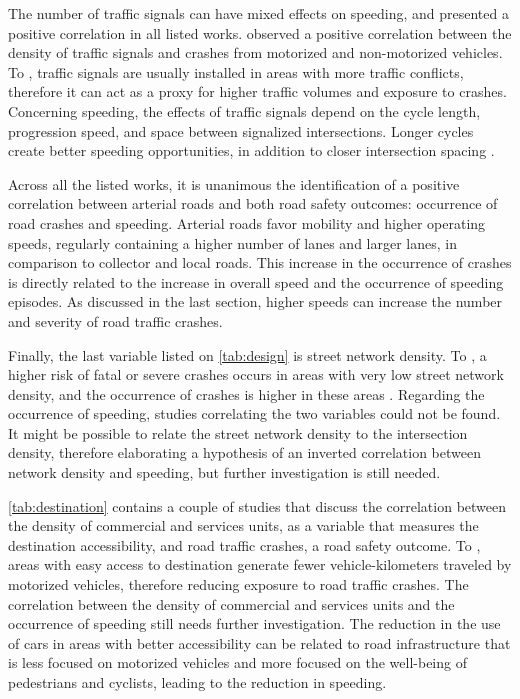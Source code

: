 The number of traffic signals can have mixed effects on speeding, and presented a positive correlation in all listed works. \textcite{Lovegrove2006,Lee2015} observed a positive correlation between the density of traffic signals and crashes from motorized and non-motorized vehicles. To \textcite{Obelheiro2020}, traffic signals are usually installed in areas with more traffic conflicts, therefore it can act as a proxy for higher traffic volumes and exposure to crashes. Concerning speeding, the effects of traffic signals depend on the cycle length, progression speed, and space between signalized intersections. Longer cycles create better speeding opportunities, in addition to closer intersection spacing \cite{Elvik2009,Furth2018}. 

Across all the listed works, it is unanimous the identification of a positive correlation between arterial roads and both road safety outcomes: occurrence of road crashes and speeding. Arterial roads favor mobility and higher operating speeds, regularly containing a higher number of lanes and larger lanes, in comparison to collector and local roads. This increase in the occurrence of crashes is directly related to the increase in overall speed and the occurrence of speeding episodes. As discussed in the last section, higher speeds can increase the number and severity of road traffic crashes. 

Finally, the last variable listed on \autoref{tab:design} is street network density. To \textcite{Marshall2010}, a higher risk of fatal or severe crashes occurs in areas with very low street network density, and the occurrence of crashes is higher in these areas \cite{Marshall2011}. Regarding the occurrence of speeding, studies correlating the two variables could not be found. It might be possible to relate the street network density to the intersection density, therefore elaborating a hypothesis of an inverted correlation between network density and speeding, but further investigation  is still needed. 

\autoref{tab:destination} contains a couple of studies that discuss the correlation between the density of commercial and services units, as a variable that measures the destination accessibility, and road traffic crashes, a road safety outcome. To \textcite{Ouyang2014,Welle2016}, areas with easy access to destination generate fewer vehicle-kilometers traveled by motorized vehicles, therefore reducing exposure to road traffic crashes. The correlation between the density of commercial and services units and the occurrence of speeding still needs further investigation. The reduction in the use of cars in areas with better accessibility can be related to road infrastructure that is less focused on motorized vehicles and more focused on the well-being of pedestrians and cyclists, leading to the reduction in speeding. 

